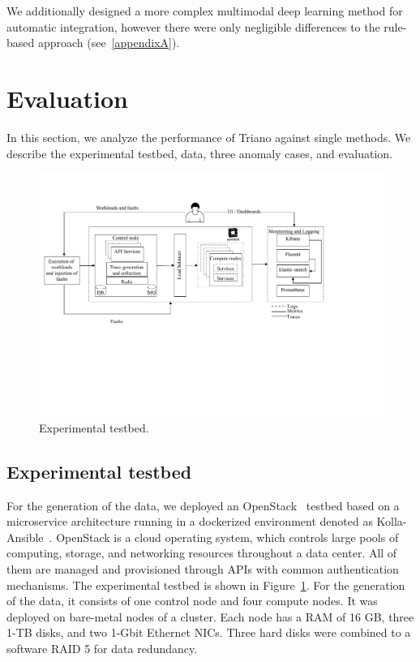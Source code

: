 We additionally designed a more complex multimodal deep learning method for automatic integration, however there were only negligible differences to the rule-based approach (see~\autoref{appendixA}).

\section{Evaluation}
In this section, we analyze the performance of Triano against single methods. We describe the experimental testbed, data, three anomaly cases, and evaluation. 

\begin{figure}[!htbp]
\centerline{\includegraphics[width=1.0\textwidth]{gfx/chap7/testbedTriano.pdf}}
\caption{Experimental testbed.}
\label{fig:Trianotestbed}
\end{figure}

\subsection{Experimental testbed}
For the generation of the data, we deployed an OpenStack~\cite{ShrivastwaOpenstack} testbed based on a microservice architecture running in a dockerized environment denoted as Kolla-Ansible~\cite{kollaansible}.
OpenStack is a cloud operating system, which controls large pools of computing, storage, and networking resources throughout a data center. All of them are managed and provisioned through APIs with common authentication mechanisms.
The experimental testbed is shown in Figure~\ref{fig:Trianotestbed}. For the generation of the data, it consists of one control node and four compute nodes. It was deployed on bare-metal nodes of a cluster. Each node has a RAM of 16 GB, three 1-TB disks, and two 1-Gbit Ethernet NICs. Three hard disks were combined to a software RAID 5 for data redundancy.

